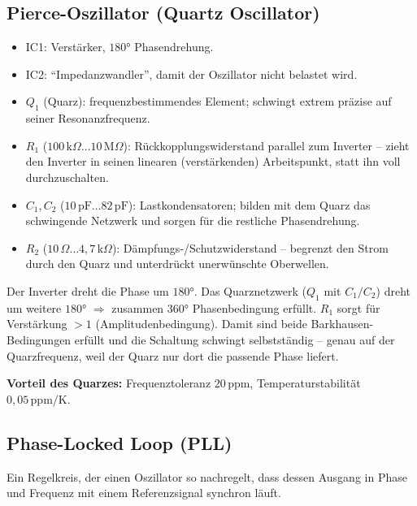 \documentclass[11pt,a4paper]{article}
\begin{document}
\subsection{Pierce-Oszillator (Quartz Oscillator)}
\begin{itemize}
    \item IC1: Verstärker, $180°$ Phasendrehung.
    \item IC2: ``Impedanzwandler'', damit der Oszillator nicht belastet wird.
    \item $Q_1$ (Quarz): frequenzbestimmendes Element; schwingt extrem präzise auf seiner Resonanzfrequenz.
    \item $R_1$ ($100\,\text{k}\Omega \ldots 10\,\text{M}\Omega$): Rückkopplungswiderstand parallel zum Inverter -- zieht den Inverter in seinen linearen (verstärkenden) Arbeitspunkt, statt ihn voll durchzuschalten.
    \item $C_1, C_2$ ($10\,\text{pF} \ldots 82\,\text{pF}$): Lastkondensatoren; bilden mit dem Quarz das schwingende Netzwerk und sorgen für die restliche Phasendrehung.
    \item $R_2$ ($10\,\Omega \ldots 4{,}7\,\text{k}\Omega$): Dämpfungs-/Schutzwiderstand -- begrenzt den Strom durch den Quarz und unterdrückt unerwünschte Oberwellen.
\end{itemize}

Der Inverter dreht die Phase um $180°$. Das Quarznetzwerk ($Q_1$ mit $C_1/C_2$) dreht um weitere $180°$ $\Rightarrow$ zusammen $360°$ Phasenbedingung erfüllt. $R_1$ sorgt für Verstärkung $>1$ (Amplitudenbedingung). Damit sind beide Barkhausen-Bedingungen erfüllt und die Schaltung schwingt selbstständig -- genau auf der Quarzfrequenz, weil der Quarz nur dort die passende Phase liefert.

\textbf{Vorteil des Quarzes:} Frequenztoleranz $20\,\text{ppm}$, Temperaturstabilität $0{,}05\,\text{ppm/K}$.

\subsection{Phase-Locked Loop (PLL)}
Ein Regelkreis, der einen Oszillator so nachregelt, dass dessen Ausgang in Phase und Frequenz mit einem Referenzsignal synchron läuft.
\end{document}
